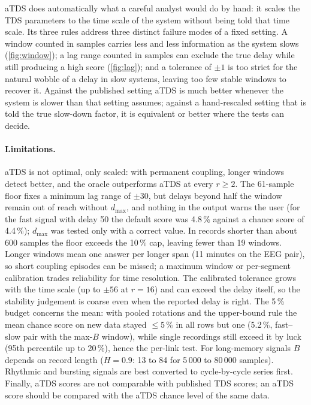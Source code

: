\documentclass[11pt,a4paper]{article}
\begin{document}
aTDS does automatically what a careful analyst would do by hand: it scales the TDS parameters to the time scale of the system without being told that time scale. Its three rules address three distinct failure modes of a fixed setting. A window counted in samples carries less and less information as the system slows (\cref{fig:window}); a lag range counted in samples can exclude the true delay while still producing a high score (\cref{fig:lag}); and a tolerance of $\pm1$ is too strict for the natural wobble of a delay in slow systems, leaving too few stable windows to recover it. Against the published setting aTDS is much better whenever the system is slower than that setting assumes; against a hand-rescaled setting that is told the true slow-down factor, it is equivalent or better where the tests can decide.

\paragraph{Limitations.} aTDS is not optimal, only scaled: with permanent coupling, longer windows detect better, and the oracle outperforms aTDS at every $r \ge 2$. The 61-sample floor fixes a minimum lag range of $\pm30$, but delays beyond half the window remain out of reach without $d_{\max}$, and nothing in the output warns the user (for the fast signal with delay 50 the default score was 4.8\,\% against a chance score of 4.4\,\%); $d_{\max}$ was tested only with a correct value. In records shorter than about 600 samples the floor exceeds the 10\,\% cap, leaving fewer than 19 windows. Longer windows mean one answer per longer span (11 minutes on the EEG pair), so short coupling episodes can be missed; a maximum window or per-segment calibration trades reliability for time resolution. The calibrated tolerance grows with the time scale (up to $\pm56$ at $r = 16$) and can exceed the delay itself, so the stability judgement is coarse even when the reported delay is right. The 5\,\% budget concerns the mean: with pooled rotations and the upper-bound rule the mean chance score on new data stayed $\le 5\,\%$ in all rows but one (5.2\,\%, fast--slow pair with the max-$B$ window), while single recordings still exceed it by luck (95th percentile up to 20\,\%), hence the per-link test. For long-memory signals $B$ depends on record length ($H = 0.9$: 13 to 84 for 5\,000 to 80\,000 samples). Rhythmic and bursting signals are best converted to cycle-by-cycle series first. Finally, aTDS scores are not comparable with published TDS scores; an aTDS score should be compared with the aTDS chance level of the same data.
\end{document}
